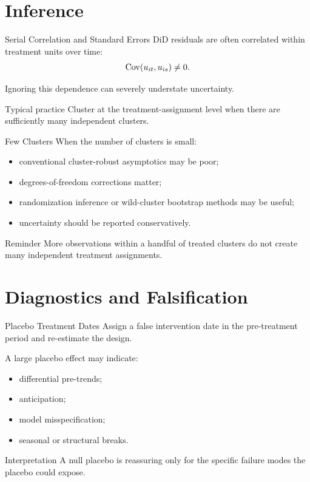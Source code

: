 \documentclass[aspectratio=169,11pt]{beamer}
\begin{document}
\section{Inference}

\begin{frame}{Serial Correlation and Standard Errors}
DiD residuals are often correlated within treatment units over time:
\[
\operatorname{Cov}(u_{it},u_{is})\neq 0.
\]

Ignoring this dependence can severely understate uncertainty.

\begin{block}{Typical practice}
Cluster at the treatment-assignment level when there are sufficiently many independent clusters.
\end{block}
\end{frame}

\begin{frame}{Few Clusters}
When the number of clusters is small:
\begin{itemize}
\item conventional cluster-robust asymptotics may be poor;
\item degrees-of-freedom corrections matter;
\item randomization inference or wild-cluster bootstrap methods may be useful;
\item uncertainty should be reported conservatively.
\end{itemize}

\begin{alertblock}{Reminder}
More observations within a handful of treated clusters do not create many independent treatment assignments.
\end{alertblock}
\end{frame}

\section{Diagnostics and Falsification}

\begin{frame}{Placebo Treatment Dates}
Assign a false intervention date in the pre-treatment period and re-estimate the design.

A large placebo effect may indicate:
\begin{itemize}
\item differential pre-trends;
\item anticipation;
\item model misspecification;
\item seasonal or structural breaks.
\end{itemize}

\begin{block}{Interpretation}
A null placebo is reassuring only for the specific failure modes the placebo could expose.
\end{block}
\end{frame}
\end{document}
